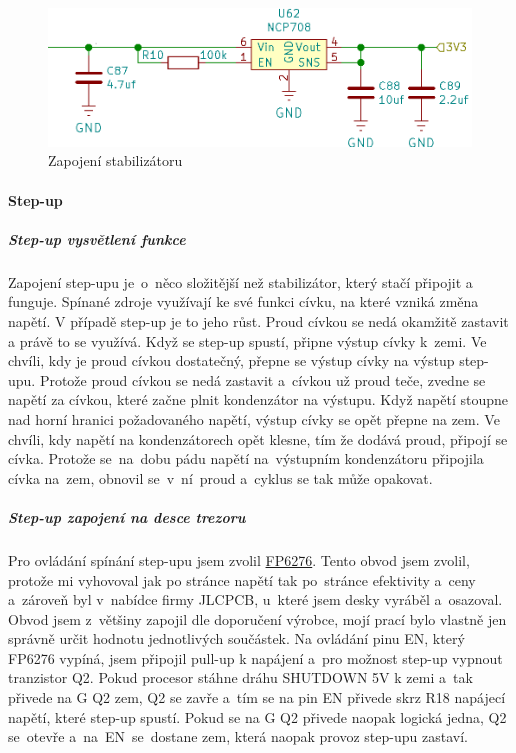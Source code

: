 \begin{figure}[htbp]
    \centering
    \includegraphics[width=400pt]{kapitoly/obrazky/E4/napajeni/stabilizator.png}
    \caption{Zapojení stabilizátoru}
    \label{fig:E4-stabilizator}
\end{figure}

\paragraph*{Step-up}

\subparagraph*{Step-up vysvětlení funkce}
Zapojení step-upu je~o~něco složitější než stabilizátor, který stačí připojit a funguje. Spínané zdroje využívají ke své funkci cívku, na které
vzniká změna napětí. V případě step-up je to jeho růst. Proud cívkou se nedá okamžitě zastavit a právě to se využívá. 
Když se step-up spustí, připne výstup cívky k~zemi. Ve chvíli, kdy je proud cívkou dostatečný, přepne se výstup cívky na výstup step-upu.
Protože proud cívkou se nedá zastavit a~cívkou už proud teče, zvedne se napětí za cívkou, které začne plnit kondenzátor na výstupu.
Když napětí stoupne nad horní hranici požadovaného napětí, výstup cívky se opět přepne na zem. Ve chvíli, kdy napětí na kondenzátorech opět 
klesne, tím že dodává proud, připojí se cívka. Protože se~na~dobu pádu napětí na~výstupním kondenzátoru připojila cívka na~zem, obnovil 
se~v~ní~proud a~cyklus se tak může opakovat.


\subparagraph*{Step-up zapojení na desce trezoru} 

Pro ovládání spínání step-upu jsem zvolil \href{https://datasheet.lcsc.com/szlcsc/Feeling-Tech-FP6276AXR-G1_C83308.pdf}{FP6276}.
Tento obvod jsem zvolil, protože mi vyhovoval jak po stránce napětí tak po~stránce efektivity a~ceny a~zároveň byl v~nabídce firmy JLCPCB,
u~které jsem desky vyráběl a~osazoval. 
Obvod jsem z~většiny zapojil dle doporučení výrobce, mojí prací bylo vlastně jen správně určit hodnotu 
jednotlivých součástek. Na ovládání pinu EN, který FP6276 vypíná, jsem připojil pull-up k napájení a~pro možnost step-up vypnout tranzistor Q2. 
Pokud procesor stáhne dráhu SHUTDOWN 5V k zemi a~tak přivede na G Q2 zem, Q2 se zavře a~tím se na pin EN přivede skrz R18 napájecí napětí, 
které step-up spustí. Pokud se na G Q2 přivede naopak logická jedna, Q2 se~otevře a~na~EN~se~dostane zem, která naopak provoz step-upu zastaví.

